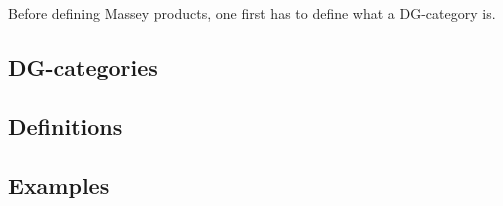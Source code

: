 Before defining Massey products, one first has to define what a DG-category is.

\subsection{DG-categories}


\subsection{Definitions}


\subsection{Examples}
